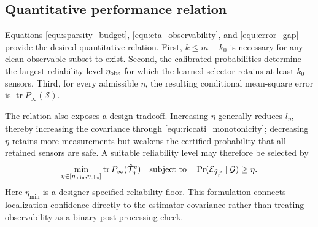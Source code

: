 \subsection{Quantitative performance relation}
Equations \eqref{equ:sparsity_budget}, \eqref{equ:eta_observability}, and \eqref{equ:error_gap} provide the desired quantitative relation. First, $k\le m-k_0$ is necessary for any clean observable subset to exist. Second, the calibrated probabilities determine the largest reliability level $\eta_{\rm obs}$ for which the learned selector retains at least $k_0$ sensors. Third, for every admissible $\eta$, the resulting conditional mean-square error is $\operatorname{tr}P_\infty(\mathcal S)$.

The relation also exposes a design tradeoff. Increasing $\eta$ generally reduces $l_\eta$, thereby increasing the covariance through \eqref{equ:riccati_monotonicity}; decreasing $\eta$ retains more measurements but weakens the certified probability that all retained sensors are safe. A suitable reliability level may therefore be selected by
\begin{equation}\label{equ:eta_design}
\min_{\eta\in[\eta_{\min},\eta_{\rm obs}]}
\operatorname{tr}P_\infty(\hat{\mathcal{T}}_\eta^c)
\quad
\text{subject to}\quad
\Pr(\mathcal{E}_{\hat{\mathcal{T}}_\eta^c}\mid\mathcal G)\ge\eta.
\end{equation}
Here $\eta_{\min}$ is a designer-specified reliability floor. This formulation connects localization confidence directly to the estimator covariance rather than treating observability as a binary post-processing check.
